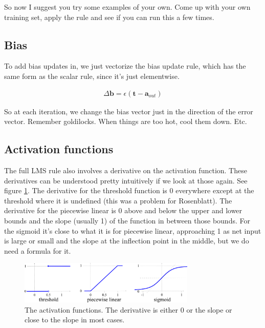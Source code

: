 So now I suggest you try some examples of your own. Come up with your own training set, apply the rule and see if you can run this a few times. 

\subsection{Bias}

To add bias updates in, we just vectorize the bias update rule, which has the same form as the scalar rule, since it's just elementwise.

\begin{eqnarray*}
\Delta \mathbf{b}  =  \epsilon (\mathbf{t} - \mathbf{a}_{out})
\end{eqnarray*}

So at each iteration, we change the bias vector just in the direction of the error vector. Remember goldilocks. When things are too hot, cool them down. Etc.

\subsection{Activation functions}

The full LMS rule also involves a derivative on the activation function. These derivatives can be understood pretty intuitively if we look at those again. See figure \ref{derivativesActFunctions}. The derivative for the threshold function is 0 everywhere except at the threshold where it is undefined (this was a problem for Rosenblatt). The derivative for the piecewise linear is 0 above and below the upper and lower bounds and the slope (usually 1) of the function in between those bounds. For the sigmoid it's close to what it is for piecewise linear, approaching 1 as net input is large or small and the slope at the inflection point in the middle, but we do need a formula for it.

\begin{figure}[h]
\centering
\includegraphics[width=0.75\textwidth]{images/graph_binary.pdf}
\caption[Jeff Yoshimi.]{The activation functions. The derivative is either 0 or the slope or close to the slope in most cases. }
\label{derivativesActFunctions}
\end{figure}

